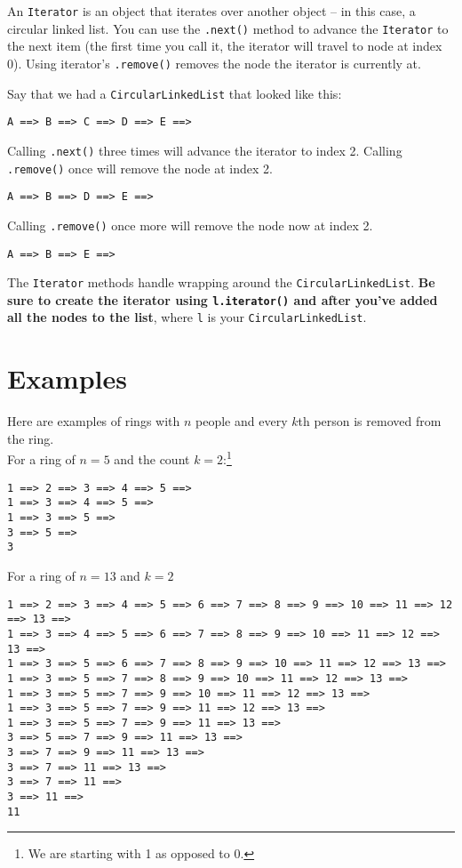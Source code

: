 \documentclass[10pt,letterpaper]{article}
\begin{document}
An \texttt{Iterator} is an object that iterates over another object --  in this case, a circular linked list.
You can use the \texttt{.next()} method to advance the \texttt{Iterator} to the next item (the first time you call it, the iterator will travel to node at index 0).
Using iterator's \texttt{.remove()} removes the node the iterator is currently at.

Say that we had a \texttt{CircularLinkedList} that looked like this:

\begin{verbatim}
A ==> B ==> C ==> D ==> E ==> 
\end{verbatim}

Calling \texttt{.next()} three times will advance the iterator to index 2. 
Calling \texttt{.remove()} once will remove the node at index 2.
\begin{verbatim}
A ==> B ==> D ==> E ==> 
\end{verbatim}
Calling \texttt{.remove()} once more will remove the node now at index 2.
\begin{verbatim}
A ==> B ==> E ==> 
\end{verbatim}

The \texttt{Iterator} methods handle wrapping around the \texttt{CircularLinkedList}.
\textbf{Be sure to create the iterator using \texttt{l.iterator()} and after you've added all the nodes to the list}, where \texttt{l} is your \texttt{CircularLinkedList}.




\newpage
\section{Examples}
Here are examples of rings with $n$ people and every $k$th person is removed from the ring.\\
For a ring of $n=5$ and the count $k=2$:\footnote{We are starting with 1 as opposed to 0.}

\begin{verbatim}
1 ==> 2 ==> 3 ==> 4 ==> 5 ==> 
1 ==> 3 ==> 4 ==> 5 ==> 
1 ==> 3 ==> 5 ==> 
3 ==> 5 ==> 
3

\end{verbatim}



For a ring of $n=13$ and $k=2$
\begin{verbatim}
1 ==> 2 ==> 3 ==> 4 ==> 5 ==> 6 ==> 7 ==> 8 ==> 9 ==> 10 ==> 11 ==> 12 ==> 13 ==> 
1 ==> 3 ==> 4 ==> 5 ==> 6 ==> 7 ==> 8 ==> 9 ==> 10 ==> 11 ==> 12 ==> 13 ==> 
1 ==> 3 ==> 5 ==> 6 ==> 7 ==> 8 ==> 9 ==> 10 ==> 11 ==> 12 ==> 13 ==> 
1 ==> 3 ==> 5 ==> 7 ==> 8 ==> 9 ==> 10 ==> 11 ==> 12 ==> 13 ==> 
1 ==> 3 ==> 5 ==> 7 ==> 9 ==> 10 ==> 11 ==> 12 ==> 13 ==> 
1 ==> 3 ==> 5 ==> 7 ==> 9 ==> 11 ==> 12 ==> 13 ==> 
1 ==> 3 ==> 5 ==> 7 ==> 9 ==> 11 ==> 13 ==> 
3 ==> 5 ==> 7 ==> 9 ==> 11 ==> 13 ==> 
3 ==> 7 ==> 9 ==> 11 ==> 13 ==> 
3 ==> 7 ==> 11 ==> 13 ==> 
3 ==> 7 ==> 11 ==> 
3 ==> 11 ==> 
11
\end{verbatim}

	
\end{document}
